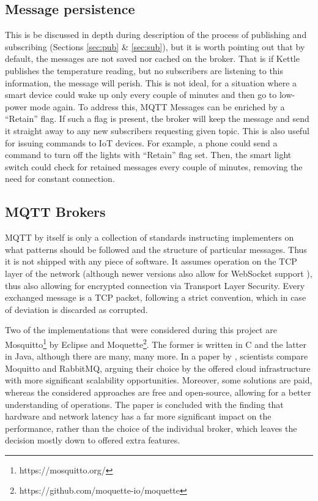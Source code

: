 \subsection{Message persistence}
This is be discussed in depth during description of the process of publishing and subscribing (Sections \ref{sec:pub} \& \ref{sec:sub}), but it is worth pointing out that by default, the messages are not saved nor cached on the broker. That is if Kettle publishes the temperature reading, but no subscribers are listening to this information, the message will perish. This is not ideal, for a situation where a smart device could wake up only every couple of minutes and then go to low-power mode again. To address this, MQTT Messages can be enriched by a ``Retain'' flag. If such a flag is present, the broker will keep the message and send it straight away to any new subscribers requesting given topic. This is also useful for issuing commands to IoT devices. For example, a phone could send a command to turn off the lights with ``Retain'' flag set. Then, the smart light switch could check for retained messages every couple of minutes, removing the need for constant connection.

\subsection{MQTT Brokers}
MQTT by itself is only a collection of standards instructing implementers on what patterns should be followed and the structure of particular messages. Thus it is not shipped with any piece of software. It assumes operation on the TCP layer of the network (although newer versions also allow for WebSocket support \citep{mijovic2016comparing}), thus also allowing for encrypted connection via Transport Layer Security. Every exchanged message is a TCP packet, following a strict convention, which in case of deviation is discarded as corrupted.

Two of the implementations that were considered during this project are Mosquitto\footnote{https://mosquitto.org/} by Eclipse and Moquette\footnote{https://github.com/moquette-io/moquette}. The former is written in C and the latter in Java, although there are many, many more. In a paper by \citet{de2019performance}, scientists compare Moquitto and RabbitMQ, arguing their choice by the offered cloud infrastructure with more significant scalability opportunities. Moreover, some solutions are paid, whereas the considered approaches are free and open-source, allowing for a better understanding of operations. The paper is concluded with the finding that hardware and network latency has a far more significant impact on the performance, rather than the choice of the individual broker, which leaves the decision mostly down to offered extra features.

